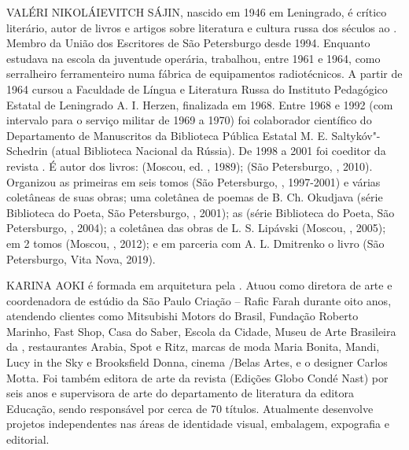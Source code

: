 \medskip

\noindent{}VALÉRI NIKOLÁIEVITCH SÁJIN, nascido em 1946 em Leningrado, é crítico
literário, autor de livros e artigos sobre literatura e cultura russa
dos séculos  ao .
Membro da União dos Escritores de São
Petersburgo desde 1994. Enquanto estudava na escola da juventude
operária, trabalhou, entre 1961 e 1964, como serralheiro ferramenteiro
numa fábrica de equipamentos radiotécnicos. A partir de 1964 cursou a
Faculdade de Língua e Literatura Russa do Instituto Pedagógico Estatal
de Leningrado A. I. Herzen, finalizada em 1968. Entre 1968 e 1992 (com
intervalo para o serviço militar de 1969 a 1970) foi colaborador
científico do Departamento de Manuscritos da Biblioteca Pública Estatal
M. E. Saltykóv"-Schedrin (atual Biblioteca Nacional da Rússia). De 1998 a
2001 foi coeditor da revista {}. É autor dos livros: {} (Moscou, ed.
{}, 1989); {} (São Petersburgo, {}, 2010). Organizou as
primeiras {} em seis tomos (São
Petersburgo, {}, 1997-2001) e várias
coletâneas de suas obras; uma coletânea de poemas de B. Ch. Okudjava
(série Biblioteca do Poeta, São Petersburgo, {}, 2001); as {} (série
Biblioteca do Poeta, São Petersburgo, {},
2004); a coletânea das obras de L. S. Lipávski {}
(Moscou, {}, 2005); {} em
2 tomos (Moscou, {}, 2012); e em
parceria com A. L. Dmitrenko o livro {} (São Petersburgo,
Vita Nova, 2019).

\medskip

\noindent{}KARINA AOKI é formada em arquitetura pela . Atuou como diretora de arte e coordenadora de estúdio da São Paulo Criação – Rafic Farah
durante oito anos, atendendo clientes como Mitsubishi Motors do Brasil,
Fundação Roberto Marinho, Fast Shop, Casa do Saber, Escola da Cidade,
Museu de Arte Brasileira da , restaurantes Arabia, Spot e Ritz,
marcas de moda Maria Bonita, Mandi, Lucy in the Sky e Brooksfield Donna,
cinema /Belas Artes, e o designer Carlos Motta. Foi também editora
de arte da revista {} (Edições Globo Condé Nast) por seis anos e
supervisora de arte do departamento de literatura da editora 
Educação, sendo responsável por cerca de 70 títulos. Atualmente
desenvolve projetos independentes nas áreas de identidade visual,
embalagem, expografia e editorial.

